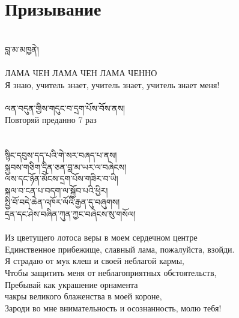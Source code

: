 \section{Призывание}
\\
\ti
བླ་མ་མཁྱནེ།\\
\\
\ru
ЛАМА ЧЕН ЛАМА ЧЕН ЛАМА ЧЕННО\\
Я знаю, учитель знает, учитель знает, учитель знает меня!\\
\\
\scriptsize \ti
ལན་བདུན་གྱིས་གདུང་བ་དྲག་པོས་བོས་ནས།\\
\ru
Повторяй преданно 7 раз\\
\\
\\
\normalsize
\ti
སྙིང་དབུས་དད་པའི་གེ་སར་བཞད་པ་ནས།\\
སྐྱབས་གཅིག་དྲིན་ཅན་བླ་མ་ཡར་ལ་བཞེངས།\\
ལས་དང་ཉོན་མོངས་དྲག་པོས་གཟིར་བ་ཡི།\\
སྐལ་བ་ངན་པ་བདག་ལ་སྐྱོབ་པའི་ཕྱིར།\\
སྤྱི་བོ་བདེ་ཆེན་འཁོར་ལོའི་རྒྱན་དུ་བཞུགས།\\
དྲན་དང་ཤེས་བཞིན་ཀུན་ཀྱང་བཞེངས་སུ་གསོལ།\\
\\
\ru
Из цветущего лотоса веры в моем сердечном центре \\
Единственное прибежище, славный лама, пожалуйста, взойди.\\
Я страдаю от мук клеш и своей неблагой кармы,\\
Чтобы защитить меня от неблагоприятных обстоятельств,\\
Пребывай как украшение орнамента \\
\indent чакры великого блаженства в моей короне, \\
Зароди во мне внимательность и осознанность, молю тебя!\\
\\
